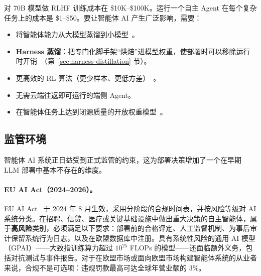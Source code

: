 对 70B 模型做 RLHF 训练成本在 \$10K--\$100K。运行一个自主 Agent 在每个复杂任务上的成本是 \$1--\$50。要让智能体 AI 产生广泛影响，需要：

\begin{itemize}
  \item 将智能体能力从大模型蒸馏到小模型~\cite{hinton2015distilling, kim2024distillation}。
  \item \textbf{Harness 蒸馏}：把专门化脚手架“烘焙”进模型权重，使部署时可以移除运行时开销~\cite{ye2026harnesszero}（第~\ref{sec:harness-distillation} 节）。
  \item 更高效的 RL 算法（更少样本、更低方差）~\cite{schulman2017proximal}。
  \item 无需云端往返即可运行的端侧 Agent。
  \item 在智能体任务上达到闭源质量的开放权重模型~\cite{deepseek2025r1}。
\end{itemize}

\subsection{监管环境}
\label{subsec:regulatory-environment}

智能体 AI 系统正日益受到正式监管的约束，这为部署决策增加了一个在早期 LLM 部署中基本不存在的维度。

\paragraph{EU AI Act（2024--2026）。}
EU AI Act~\cite{euaiact2024} 于 2024 年 8 月生效，采用分阶段的合规时间表，并按风险等级对 AI 系统分类。在招聘、信贷、医疗或关键基础设施中做出重大决策的自主智能体，属于\textbf{高风险}类别，必须满足以下要求：部署前的合格评定、人工监督机制、为事后审计保留系统行为日志，以及在欧盟数据库中注册。具有系统性风险的通用 AI 模型（GPAI）——大致指训练算力超过 $10^{25}$ FLOPs 的模型——还面临额外义务，包括对抗测试与事件报告。对于在欧盟市场或面向欧盟市场构建智能体系统的从业者来说，合规不是可选项：违规罚款最高可达全球年营业额的 3\%。

